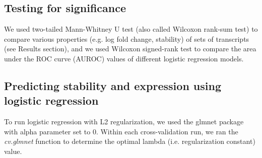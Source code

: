 
\subsection{Testing for significance}

We used two-tailed Mann-Whitney U test (also called Wilcoxon rank-sum test) to compare various properties (e.g.
log fold change, stability) of sets of transcripts (see Results section), and we used Wilcoxon signed-rank test to compare the area under the ROC curve (AUROC) values of different logistic regression models.


\subsection{Predicting stability and expression using logistic regression}

To run logistic regression with L2 regularization, we used the glmnet package \cite{glmnet} with alpha parameter set to 0. Within each cross-validation run, we ran the \textit{cv.glmnet} function to determine the optimal lambda (i.e. regularization constant) value.
